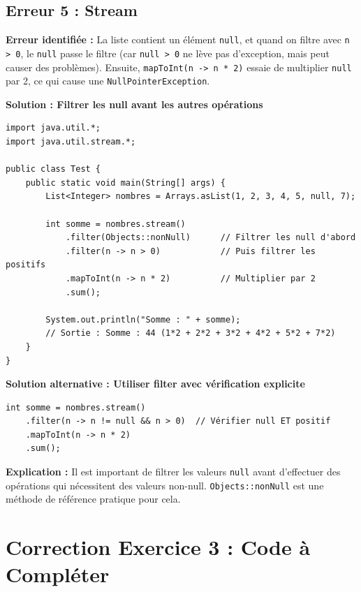 \documentclass[11pt,a4paper]{article}
\begin{document}
\subsection{Erreur 5 : Stream}

\begin{correctionbox}
\textbf{Erreur identifiée :} La liste contient un élément \texttt{null}, et quand on filtre avec \texttt{n > 0}, le \texttt{null} passe le filtre (car \texttt{null > 0} ne lève pas d'exception, mais peut causer des problèmes). Ensuite, \texttt{mapToInt(n -> n * 2)} essaie de multiplier \texttt{null} par 2, ce qui cause une \texttt{NullPointerException}.

\textbf{Solution : Filtrer les null avant les autres opérations}

\begin{lstlisting}
import java.util.*;
import java.util.stream.*;

public class Test {
    public static void main(String[] args) {
        List<Integer> nombres = Arrays.asList(1, 2, 3, 4, 5, null, 7);
        
        int somme = nombres.stream()
            .filter(Objects::nonNull)      // Filtrer les null d'abord
            .filter(n -> n > 0)            // Puis filtrer les positifs
            .mapToInt(n -> n * 2)          // Multiplier par 2
            .sum();
        
        System.out.println("Somme : " + somme);
        // Sortie : Somme : 44 (1*2 + 2*2 + 3*2 + 4*2 + 5*2 + 7*2)
    }
}
\end{lstlisting}

\textbf{Solution alternative : Utiliser filter avec vérification explicite}

\begin{lstlisting}
int somme = nombres.stream()
    .filter(n -> n != null && n > 0)  // Vérifier null ET positif
    .mapToInt(n -> n * 2)
    .sum();
\end{lstlisting}

\textbf{Explication :} Il est important de filtrer les valeurs \texttt{null} avant d'effectuer des opérations qui nécessitent des valeurs non-null. \texttt{Objects::nonNull} est une méthode de référence pratique pour cela.
\end{correctionbox}

\newpage

\section{Correction Exercice 3 : Code à Compléter}
\end{document}
